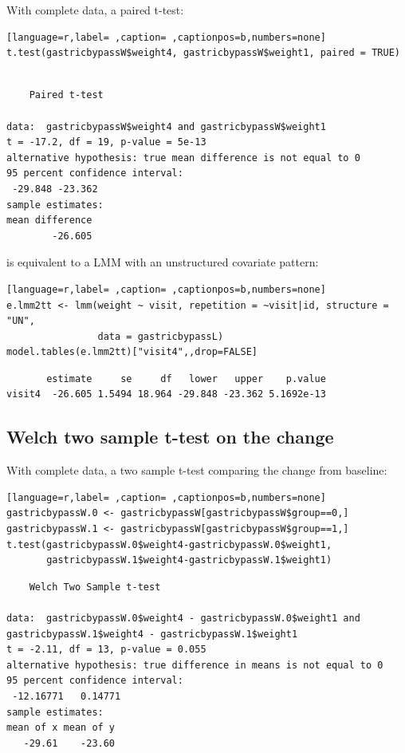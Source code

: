 \documentclass[12pt]{article}
\begin{document}
With complete data, a paired t-test:
\begin{lstlisting}[language=r,label= ,caption= ,captionpos=b,numbers=none]
t.test(gastricbypassW$weight4, gastricbypassW$weight1, paired = TRUE)
\end{lstlisting}

\begin{verbatim}

	Paired t-test

data:  gastricbypassW$weight4 and gastricbypassW$weight1
t = -17.2, df = 19, p-value = 5e-13
alternative hypothesis: true mean difference is not equal to 0
95 percent confidence interval:
 -29.848 -23.362
sample estimates:
mean difference 
        -26.605
\end{verbatim}

is equivalent to a LMM with an unstructured covariate pattern:
\begin{lstlisting}[language=r,label= ,caption= ,captionpos=b,numbers=none]
e.lmm2tt <- lmm(weight ~ visit, repetition = ~visit|id, structure = "UN",
                data = gastricbypassL)
model.tables(e.lmm2tt)["visit4",,drop=FALSE]
\end{lstlisting}

\begin{verbatim}
       estimate     se     df   lower   upper    p.value
visit4  -26.605 1.5494 18.964 -29.848 -23.362 5.1692e-13
\end{verbatim}


\clearpage

\subsection{Welch two sample t-test on the change}
\label{sec:org63c364f}

With complete data, a two sample t-test comparing the change from baseline:
\begin{lstlisting}[language=r,label= ,caption= ,captionpos=b,numbers=none]
gastricbypassW.0 <- gastricbypassW[gastricbypassW$group==0,]
gastricbypassW.1 <- gastricbypassW[gastricbypassW$group==1,]
t.test(gastricbypassW.0$weight4-gastricbypassW.0$weight1,
       gastricbypassW.1$weight4-gastricbypassW.1$weight1)
\end{lstlisting}

\begin{verbatim}
	Welch Two Sample t-test

data:  gastricbypassW.0$weight4 - gastricbypassW.0$weight1 and gastricbypassW.1$weight4 - gastricbypassW.1$weight1
t = -2.11, df = 13, p-value = 0.055
alternative hypothesis: true difference in means is not equal to 0
95 percent confidence interval:
 -12.16771   0.14771
sample estimates:
mean of x mean of y 
   -29.61    -23.60
\end{verbatim}
\end{document}
